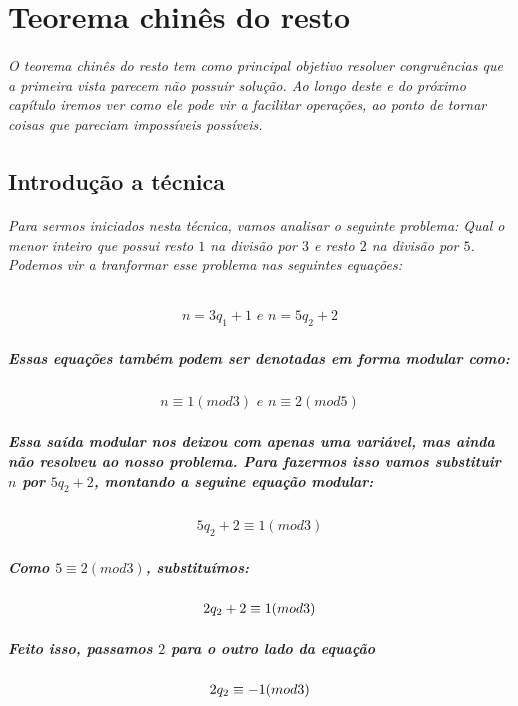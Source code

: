 \chapter {Teorema chin\^es do resto}
\label{TCR}

\subparagraph{
O teorema chin\^es do resto tem como principal objetivo resolver congru\^encias que a primeira vista parecem n\~ao possuir solu\c{c}\~ao. Ao longo deste e do pr\'oximo cap\'itulo iremos ver como ele pode vir a facilitar opera\c{c}\~oes, ao ponto de tornar coisas que pareciam imposs\'iveis poss\'iveis.
}

\section{Introdu\c{c}\~ao a t\'ecnica}

\subparagraph{
Para sermos iniciados nesta t\'ecnica, vamos analisar o seguinte problema: Qual o menor inteiro que possui resto $1$ na divis\~ao por $3$ e resto $2$ na divis\~ao por $5$. Podemos vir a tranformar esse problema nas seguintes equa\c{c}\~oes:
}
\[	
	\begin{array}{c}
		\textit{$n = 3q_1 + 1$ e $n = 5q_2 + 2$}
	\end{array}
\]
\paragraph{
Essas equa\c{c}\~oes tamb\'em podem ser denotadas em forma modular como:
}
\[	
	\begin{array}{c}
		\textit{$n \equiv 1 (mod 3)$ e $n \equiv 2 (mod 5)$}
	\end{array}
\]
\paragraph{
Essa sa\'ida modular nos deixou com apenas uma vari\'avel, mas ainda n\~ao resolveu ao nosso problema. Para fazermos isso vamos substituir $n$ por $5q_2 + 2$, montando a seguine equa\c{c}\~ao modular:
}
\[	
	\begin{array}{c}
		\textit{$5q_2 + 2 \equiv 1 (mod 3)$}
	\end{array}
\]
\paragraph{
Como $5 \equiv 2(mod 3)$, substitu\'imos:
}
\[	
	\begin{array}{c}
		\textit{$ 2q_2 + 2 \equiv 1 (mod 3)$}
	\end{array}
\]
\paragraph{
Feito isso, passamos $2$ para o outro lado da equa\c{c}\~ao
}
\[	
	\begin{array}{c}
		\textit{$ 2q_2  \equiv -1 (mod 3)$}
	\end{array}
\]
